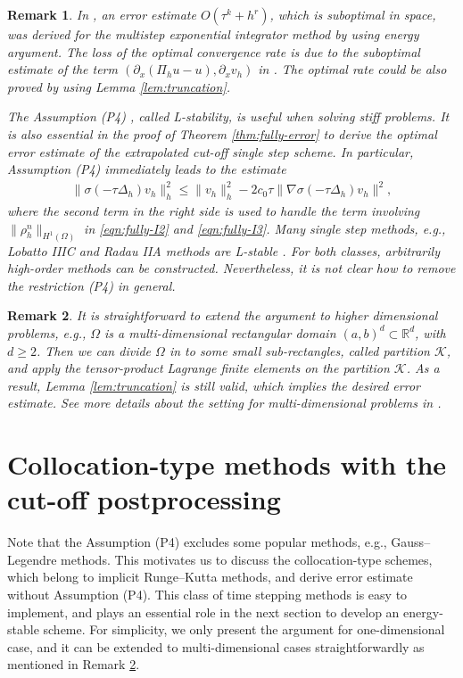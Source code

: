 \documentclass[10pt,final,leqno,onefignum,onetabnum]{siamltex}%
\newtheorem{remark}{Remark}[section]
\def\R{\mathbb{R}}
\def\II{(\Omega)}
\begin{document}
\begin{remark}\label{rem:optimal-LiYangZhou}
In \cite{LiYangZhou:sisc}, an error estimate $O(\tau^k + h^r)$,
which is  suboptimal in space, was derived
for the multistep exponential integrator method by using energy argument.
The loss of the optimal convergence rate is due to the
suboptimal estimate of the term $(\partial_x(\Pi_h u  -  u), \partial_x v_h)$
in \cite[eq. (2.6) and (3.22)]{LiYangZhou:sisc}. The optimal rate could be also
proved by using Lemma \ref{lem:truncation}.


The Assumption (P4) , called
\textsl{L-stability}, is useful when solving stiff problems.
It is also essential in the proof of Theorem \ref{thm:fully-error} to derive the optimal error estimate
of the extrapolated cut-off single step scheme. In particular,
Assumption (P4) immediately leads to the estimate
\begin{align*}
 \|  \sigma(-\tau\Delta_h) v_h \|_h^2 \le \|  v_h \|_h^2 - 2c_0\tau \| \nabla \sigma(-\tau\Delta_h) v_h\|^2,
\end{align*}
where the second term in the right side is used to handle the term involving $\|  \rho_h^n \|_{H^1\II}$
in \eqref{eqn:fully-I2} and \eqref{eqn:fully-I3}.
Many single step methods, e.g., Lobatto IIIC and Radau IIA methods are L-stable \cite{Ehle:thesis,HairerWanner:2010}.
For both classes, arbitrarily high-order methods can be constructed.
Nevertheless, it is not clear how to remove the restriction (P4) in general.
\end{remark}

\begin{remark}\label{rem:highdimension}
It is straightforward to extend the argument to higher dimensional problems, e.g., $\Omega$ is
a multi-dimensional rectangular domain $(a, b)^d \subset\R^d$, with $d\ge 2$.
Then we can divide $\Omega$ in to some small sub-rectangles, called partition $\mathcal{K}$,
and  apply the tensor-product Lagrange finite elements on the partition $\mathcal{K}$.
As a result, Lemma \ref{lem:truncation} is still valid, which implies the desired error estimate.
See more details about the setting for multi-dimensional problems in \cite[Section 2.2]{LiYangZhou:sisc}.
\end{remark}



\section{Collocation-type methods with the cut-off postprocessing}\label{sec:collocation}
Note that the Assumption (P4) excludes some
popular methods, e.g., Gauss--Legendre methods.
This motivates us to discuss the collocation-type schemes,
which belong to implicit Runge--Kutta methods, and derive error estimate without Assumption (P4).
This class of time stepping methods is easy to implement,
and plays an essential role in the next section to develop an energy-stable scheme.
For simplicity, we only present the argument for one-dimensional case,
and it can be extended to multi-dimensional cases straightforwardly as mentioned in Remark \ref{rem:highdimension}.
\end{document}
